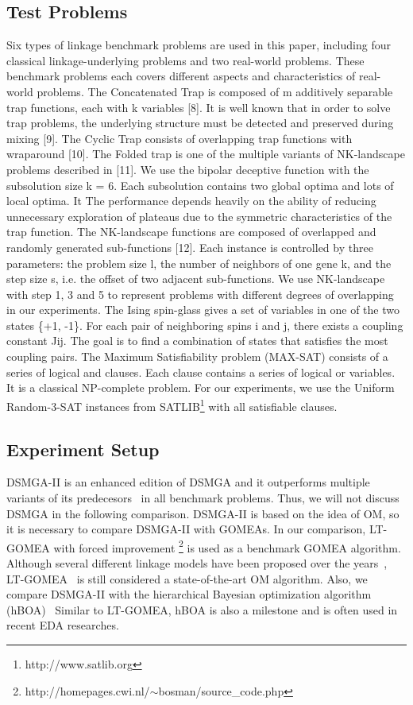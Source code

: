\documentclass{sig-alternate-05-2015}
\begin{document}
\subsection{Test Problems}
Six types of linkage benchmark problems are used in this paper, including four classical linkage-underlying problems and two real-world problems. These benchmark problems each covers different aspects and characteristics of real-world problems. The Concatenated Trap is composed of m additively separable trap functions, each with k variables [8]. It is well known that in order to solve trap problems, the underlying structure must be detected and preserved during mixing [9]. The Cyclic Trap consists of overlapping trap functions with wraparound [10]. The Folded trap is one of the multiple variants of NK-landscape problems described in [11]. We use the bipolar deceptive function with the subsolution size k = 6. Each subsolution contains two global optima and lots of local optima. It The performance depends heavily on the ability of reducing unnecessary exploration of plateaus due to the symmetric characteristics of the trap function. The NK-landscape functions are composed of overlapped and randomly generated sub-functions [12]. Each instance is controlled by three parameters: the problem size l, the number of neighbors of one gene k, and the step size s, i.e. the offset of two adjacent sub-functions. We use NK-landscape with step 1, 3 and 5 to represent problems with different degrees of overlapping in our experiments. The Ising spin-glass gives a set of variables in one of the two states \{+1, -1\}. For each pair of neighboring spins i and j, there exists a coupling constant Jij. The goal is to find a combination of states that satisfies the most coupling pairs. The Maximum Satisfiability problem (MAX-SAT) consists of a series of logical and clauses. Each clause contains a series of logical or variables. It is a classical NP-complete problem.  
For our experiments, we use the Uniform Random-3-SAT instances from SATLIB\footnote{http://www.satlib.org} with all satisfiable clauses.



\subsection{Experiment Setup}
DSMGA-II is an enhanced edition of DSMGA and it outperforms multiple variants of its predecesors~\cite{yu:DSMGA} in all benchmark problems. 
Thus, we will not discuss DSMGA in the following comparison.
DSMGA-II is based on the idea of OM, so it is necessary to compare DSMGA-II with GOMEAs. 
In our comparison, LT-GOMEA with forced improvement \footnote{http://homepages.cwi.nl/$\sim$bosman/source\_code.php} is used as a benchmark GOMEA algorithm.
Although several different linkage models have been proposed over the years~\cite{bosman:robust}, LT-GOMEA~\cite{bosman:LT-GOMEA} is still considered a state-of-the-art OM algorithm.
Also, we compare DSMGA-II with the hierarchical Bayesian optimization algorithm (hBOA)~\cite{pelikan:hBOA}
Similar to LT-GOMEA, hBOA is also a milestone and is often used in recent EDA researches.
\end{document}

